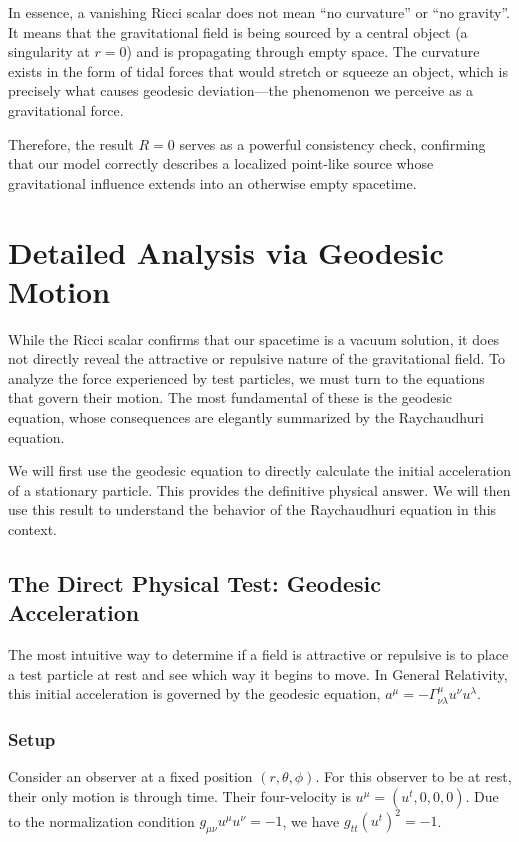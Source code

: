 \documentclass[%
  reprint,
  superscriptaddress,
  showpacs,
  showkeys,
  amsmath,amssymb,
  pra,
  longbibliography,
  floatfix,
  x11names
]{revtex4-2}
\begin{document}
In essence, a vanishing Ricci scalar does not mean ``no curvature'' or ``no gravity''. It means that the gravitational field is being sourced by a central object (a singularity at $r=0$) and is propagating through empty space. The curvature exists in the form of tidal forces that would stretch or squeeze an object, which is precisely what causes geodesic deviation---the phenomenon we perceive as a gravitational force.

Therefore, the result $R=0$ serves as a powerful consistency check, confirming that our model correctly describes a localized point-like source whose gravitational influence extends into an otherwise empty spacetime.

\section{Detailed Analysis via Geodesic Motion}
\label{sec:geodesic}

While the Ricci scalar confirms that our spacetime is a vacuum solution, it does not directly reveal the attractive or repulsive nature of the gravitational field. To analyze the force experienced by test particles, we must turn to the equations that govern their motion. The most fundamental of these is the geodesic equation, whose consequences are elegantly summarized by the Raychaudhuri equation.

We will first use the geodesic equation to directly calculate the initial acceleration of a stationary particle. This provides the definitive physical answer. We will then use this result to understand the behavior of the Raychaudhuri equation in this context.

\subsection{The Direct Physical Test: Geodesic Acceleration}

The most intuitive way to determine if a field is attractive or repulsive is to place a test particle at rest and see which way it begins to move. In General Relativity, this initial acceleration is governed by the geodesic equation, $a^\mu = -\Gamma^\mu_{\nu\lambda}u^\nu u^\lambda$.

\subsubsection{Setup}
Consider an observer at a fixed position $(r, \theta, \phi)$. For this observer to be at rest, their only motion is through time. Their four-velocity is $u^\mu = (u^t, 0, 0, 0)$. Due to the normalization condition $g_{\mu\nu}u^\mu u^\nu = -1$, we have $g_{tt}(u^t)^2 = -1$.
\end{document}
